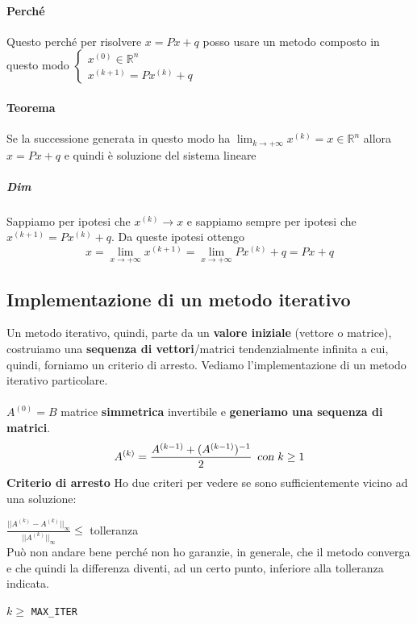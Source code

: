 \documentclass[10pt]{book}
\begin{document}
\paragraph{Perché} Questo perché per risolvere $x = Px + q$ posso usare un metodo composto in questo modo $\left\{ \begin{array}{l}
x^{(0)} \in \mathbb{R}^n\\
x^{(k + 1)} = Px^{(k)} + q
\end{array} \right.$
\paragraph{Teorema} Se la successione generata in questo modo ha $\lim_{k\to +\infty} x^{(k)} = x \in \mathbb{R}^n$ allora $x = Px + q$ e quindi è soluzione del sistema lineare
\subparagraph{Dim} Sappiamo per ipotesi che $x^{(k)} \rightarrow x$ e sappiamo sempre per ipotesi che $x^{(k + 1)} = Px^{(k)} + q$. Da queste ipotesi ottengo
$$x = \lim_{x\to +\infty}x^{(k + 1)} = \lim_{x\to +\infty} Px^{(k)} + q = Px + q$$
\subsection{Implementazione di un metodo iterativo}
Un metodo iterativo, quindi, parte da un \textbf{valore iniziale} (vettore o matrice), costruiamo una \textbf{sequenza di vettori}/matrici tendenzialmente infinita a cui, quindi, forniamo un criterio di arresto. Vediamo l'implementazione di un metodo iterativo particolare.\\\\
$A^{(0)} = B$ matrice \textbf{simmetrica} invertibile e \textbf{generiamo una sequenza di matrici}.\\
$$A^{(k)} = \frac{A^{(k-1)} + (A^{(k-1)})^{-1}}{2}\:\:\textsl{con }k \geq 1$$
\textbf{Criterio di arresto} Ho due criteri per vedere se sono sufficientemente vicino ad una soluzione:
\begin{list}{}{}
	\item $\frac{||A^{(k)} - A^{(k)}||_{\infty}}{||A^{(k)}||_{\infty}} \leq$ tolleranza\\
	Può non andare bene perché non ho garanzie, in generale, che il metodo converga e che quindi la differenza diventi, ad un certo punto, inferiore alla tolleranza indicata.
	\item $k \geq$ \texttt{MAX\_ITER}
\end{list}
\pagebreak
\end{document}
